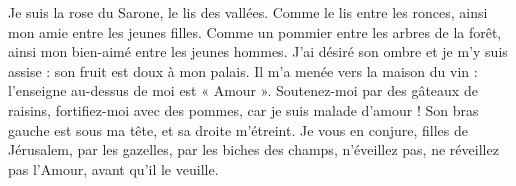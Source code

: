 Je suis la rose du Sarone, le lis des vallées.
Comme le lis entre les ronces, ainsi mon amie entre les jeunes filles.
Comme un pommier entre les arbres de la forêt, ainsi mon bien-aimé entre les jeunes hommes. J’ai désiré son ombre et je m’y suis assise : son fruit est doux à mon palais.
Il m’a menée vers la maison du vin : l’enseigne au-dessus de moi est « Amour ».
Soutenez-moi par des gâteaux de raisins, fortifiez-moi avec des pommes, car je suis malade d’amour !
Son bras gauche est sous ma tête, et sa droite m’étreint.
Je vous en conjure, filles de Jérusalem, par les gazelles, par les biches des champs, n’éveillez pas, ne réveillez pas l’Amour, avant qu’il le veuille.
